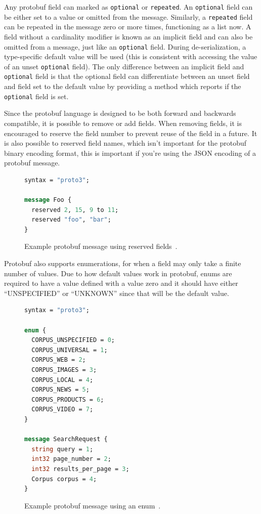 Any protobuf field can marked as \texttt{optional} or \texttt{repeated}. An
\texttt{optional} field can be either set to a value or omitted from the
message. Similarly, a \texttt{repeated} field can be repeated in the message
zero or more times, functioning as a list now. A field without a cardinality
modifier is known as an implicit field and can also be omitted from a message,
just like an \texttt{optional} field. During de-serialization, a type-specific
default value will be used (this is consistent with accessing the value of an
unset \texttt{optional} field). The only difference between an implicit field
and \texttt{optional} field is that the optional field can differentiate between
an unset field and field set to the default value by providing a method which
reports if the \texttt{optional} field is set.

Since the protobuf language is designed to be both forward and backwards
compatible, it is possible to remove or add fields. When removing fields, it is
encouraged to reserve the field number to prevent reuse of the field in a
future. It is also possible to reserved field names, which isn't important for
the protobuf binary encoding format, this is important if you're using the JSON
encoding of a protobuf message.

\begin{figure}[H]
	\begin{lstlisting}[language=proto]
syntax = "proto3";

message Foo {
  reserved 2, 15, 9 to 11;
  reserved "foo", "bar";
}\end{lstlisting}

	\caption{Example protobuf message using reserved fields~\cite{LanguageGuideProto}.}
	\label{fig:proto-reserved}
\end{figure}

Protobuf also supports enumerations, for when a field may only take a finite
number of values. Due to how default values work in protobuf, enums are required
to have a value defined with a value zero and it should have either
``UNSPECIFIED'' or ``UNKNOWN'' since that will be the default value.

\begin{figure}[H]
	\begin{lstlisting}[language=proto]
syntax = "proto3";

enum {
  CORPUS_UNSPECIFIED = 0;
  CORPUS_UNIVERSAL = 1;
  CORPUS_WEB = 2;
  CORPUS_IMAGES = 3;
  CORPUS_LOCAL = 4;
  CORPUS_NEWS = 5;
  CORPUS_PRODUCTS = 6;
  CORPUS_VIDEO = 7;
}

message SearchRequest {
  string query = 1;
  int32 page_number = 2;
  int32 results_per_page = 3;
  Corpus corpus = 4;
}\end{lstlisting}

	\caption{Example protobuf message using an enum~\cite{LanguageGuideProto}.}
	\label{fig:proto-enum}
\end{figure}

